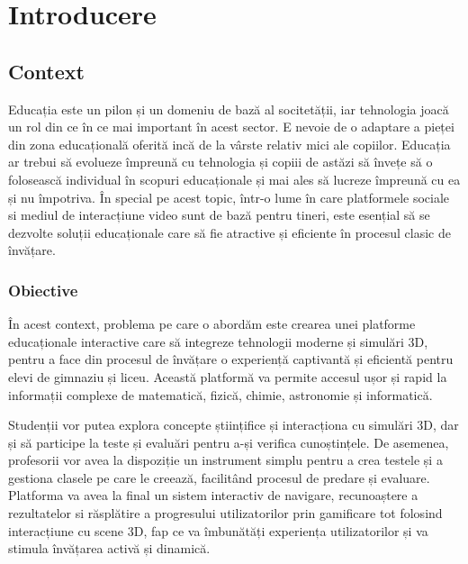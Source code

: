 \chapter{Introducere}
\label{chapter:intro}


\section{Context}
\label{sec:proj}
Educația este un pilon și un domeniu de bază al socitetății, iar tehnologia joacă un rol din ce în ce mai important
în acest sector. E nevoie de o adaptare a pieței din zona educațională oferită incă de la vârste relativ mici ale copiilor.
Educația ar trebui să evolueze împreună cu tehnologia și copiii de astăzi să învețe să o folosească
individual în scopuri educaționale și mai ales să lucreze împreună cu ea și nu împotriva. În special pe acest topic, într-o lume în care
platformele sociale si mediul de interacțiune video sunt de bază pentru tineri, este esențial să se dezvolte soluții
educaționale care să fie atractive și eficiente în procesul clasic de învățare.

\subsection{Obiective}
\label{sub-sec:proj-scope}
În acest context, problema pe care o abordăm este crearea unei platforme educaționale interactive care să integreze
tehnologii moderne și simulări 3D, pentru a face din procesul de învățare o experiență captivantă și eficientă pentru
elevi de gimnaziu și liceu. Această platformă va permite accesul ușor și rapid la informații complexe de matematică,
fizică, chimie, astronomie și informatică.

Studenții vor putea explora concepte științifice și interacționa cu simulări 3D, dar și să participe la teste și evaluări
pentru a-și verifica cunoștințele. De asemenea, profesorii vor avea la dispoziție un instrument simplu pentru a crea testele și
a gestiona clasele pe care le creează, facilitând procesul de predare și evaluare. Platforma va avea la final un sistem interactiv de
navigare, recunoaștere a rezultatelor si răsplătire a progresului utilizatorilor prin gamificare tot folosind interacțiune cu scene 3D,
fap ce va îmbunătăți experiența utilizatorilor și va stimula învățarea activă și dinamică.


